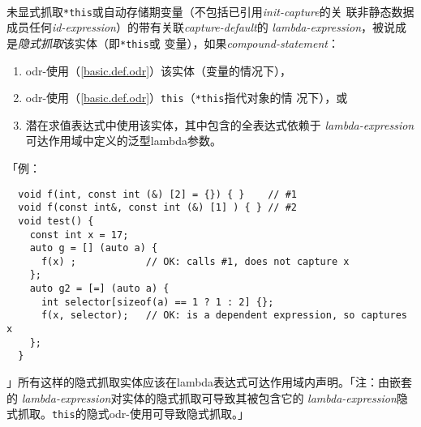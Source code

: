 \paragraph{}
未显式抓取\texttt{*this}或自动存储期变量（不包括已引用\textit{init-capture}的关
联非静态数据成员任何\textit{id-expression}）的带有关联\textit{capture-default}的
\textit{lambda-expression}，被说成是\textit{隐式抓取}该实体（即\texttt{*this}或
变量），如果\textit{compound-statement}：
\begin{enumerate}
  \item{odr-使用（\ref{basic.def.odr}）该实体（变量的情况下），}
  \item{odr-使用（\ref{basic.def.odr}）\texttt{this}（\texttt{*this}指代对象的情
    况下），或}
  \item{潜在求值表达式中使用该实体，其中包含的全表达式依赖于
    \textit{lambda-expression}可达作用域中定义的泛型lambda参数。}
\end{enumerate}
「例：
\begin{lstlisting}
  void f(int, const int (&) [2] = {}) { }    // #1
  void f(const int&, const int (&) [1] ) { } // #2
  void test() {
    const int x = 17;
    auto g = [] (auto a) {
      f(x) ;            // OK: calls #1, does not capture x
    };
    auto g2 = [=] (auto a) {
      int selector[sizeof(a) == 1 ? 1 : 2] {};
      f(x, selector);   // OK: is a dependent expression, so captures x
    };
  }
\end{lstlisting}
」所有这样的隐式抓取实体应该在lambda表达式可达作用域内声明。「注：由嵌套的
\textit{lambda-expression}对实体的隐式抓取可导致其被包含它的
\textit{lambda-expression}隐式抓取。\texttt{this}的隐式odr-使用可导致隐式抓取。」

